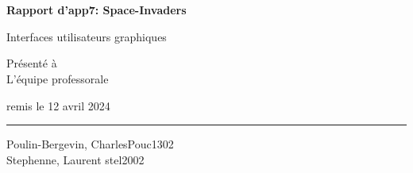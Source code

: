 \begin{center}
{\bfseries\sffamily {}\\[4pt] \\}
\setcounter{page}{0}
\thispagestyle{empty}
\vfill
\textbf{\huge{Rapport d'app7: Space-Invaders}}

\vfill
\textsf{\large Interfaces utilisateurs graphiques}

\vfill
\textsf{Présenté à}\\
\textsf{L'équipe professorale}

\vfill
\vfill
\vfill
\textsf{\footnotesize remis le 12 avril 2024}

\end{center}


\noindent
\rule{\linewidth}{.8pt}

\noindent
Poulin-Bergevin, Charles\hfill Pouc1302\\
Stephenne, Laurent \hfill stel2002\\
